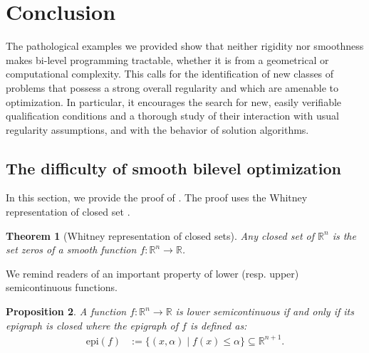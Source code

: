 \documentclass{article}
\newcommand*{\RR}{\mathbb{R}}
\newcommand{\TLc}[1]{[\textcolor{red}{Tung: #1}]}
\newcommand{\ed}[1]{\textcolor{blue}{ED: #1}}
\theoremstyle{plain}
\newtheorem{theorem}{Theorem}[section]
\newtheorem{proposition}[theorem]{Proposition}
\theoremstyle{definition}
\begin{document}
\bigskip


\section{Conclusion} 
{
The pathological examples we provided show that neither rigidity nor smoothness makes bi-level programming tractable, whether it is from a geometrical or computational complexity. This calls for the identification of new classes of problems that possess a strong overall regularity and which are amenable to optimization. In particular, it encourages the search for new, easily verifiable qualification conditions and a thorough study of their interaction with usual regularity assumptions, and with the behavior of solution algorithms.}

\begin{appendices}
\section{The difficulty of smooth bilevel optimization}
\label{appendix:regularity-not-good-enough}
In this section, we provide the proof of . The proof uses the Whitney representation of closed set \cite[Section 3.10, 2]{lafontaine2015introduction} \cite[Theorem 2.29]{lee2000smoothmanifolds}.


\begin{theorem}[Whitney representation of closed sets]
    \label{theorem:whitney-representation}
    Any closed set of $\RR^n$ is the set zeros of a smooth function $f: \RR^n \to \RR$. 
\end{theorem}

We remind readers of an important property of lower (resp. upper) semicontinuous functions.
\begin{proposition}
    \label{prop:property-lsc}
    A function $f:\RR^n \to \RR$ is lower semicontinuous if and only if its epigraph is closed where the epigraph of $f$ is defined as:
    \begin{equation*}
        \begin{aligned}
            \mathrm{epi}(f) &:= \{(x,\alpha) \mid f(x) \leq \alpha\} \subseteq \RR^{n+1}.
        \end{aligned}
    \end{equation*}
\end{proposition}


\end{appendices}
\end{document}
